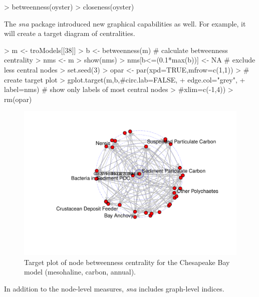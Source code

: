 \documentclass[article]{jss}
\begin{document}
\begin{Schunk}
\begin{Sinput}
> betweenness(oyster)
> closeness(oyster)
\end{Sinput}
\end{Schunk}

The \textit{sna} package introduced new graphical capabilities as
well. For example, it will create a target diagram of centralities.


\begin{Schunk}
\begin{Sinput}
> m <- troModels[[38]]
> b <- betweenness(m)         # calculate betweenness centrality
> nms <- m%
> show(nms)
> nms[b<=(0.1*max(b))] <- NA  # exclude less central nodes
> set.seed(3)
> opar <- par(xpd=TRUE,mfrow=c(1,1))
> # create target plot
> gplot.target(m,b,#circ.lab=FALSE,
+              edge.col="grey",
+              label=nms) # show only labels of most central nodes
>              #xlim=c(-1,4))
> rm(opar)
\end{Sinput}
\end{Schunk}

\begin{figure}[!htbp]
  \center
\includegraphics[]{enaR-vignette-051}
\caption{Target plot of node betweenness centrality for the Chesapeake
  Bay model (mesohaline, carbon, annual).} \label{fig:target}
\end{figure}


In addition to the node-level measures, \textit{sna} includes graph-level
indices.
\end{document}
